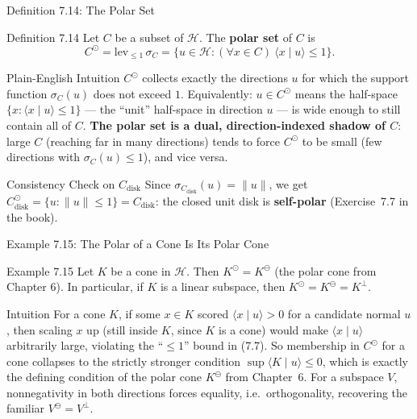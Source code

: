 \documentclass[aspectratio=169,10pt]{beamer}
\newcommand{\Hil}{\mathcal{H}}
\newcommand{\ip}[2]{\langle #1 \mid #2 \rangle}
\begin{document}
\begin{frame}{Definition 7.14: The Polar Set}

  \begin{block}{Definition 7.14}
    Let $C$ be a subset of $\Hil$. The \textbf{polar set} of $C$ is
    \[
      C^\odot = \mathrm{lev}_{\le 1}\, \sigma_C = \{u \in \Hil :
      (\forall x \in C)\ \ip{x}{u} \le 1\}. \tag{7.7}
    \]
  \end{block}

  \begin{block}{Plain-English Intuition}
    $C^\odot$ collects exactly the directions $u$ for which the support
    function $\sigma_C(u)$ does not exceed $1$. Equivalently: $u \in
    C^\odot$ means the half-space $\{x : \ip{x}{u}\le 1\}$ --- the ``unit''
    half-space in direction $u$ --- is wide enough to still contain all of
    $C$. \textbf{The polar set is a dual, direction-indexed shadow of $C$}:
    large $C$ (reaching far in many directions) tends to force $C^\odot$ to
    be small (few directions with $\sigma_C(u)\le 1$), and vice versa.
  \end{block}

  \begin{block}{Consistency Check on $C_{\mathrm{disk}}$}
    Since $\sigma_{C_{\mathrm{disk}}}(u) = \|u\|$, we get
    $C_{\mathrm{disk}}^\odot = \{u : \|u\| \le 1\} = C_{\mathrm{disk}}$: the
    closed unit disk is \textbf{self-polar} (Exercise~7.7 in the book).
  \end{block}

\end{frame}

\begin{frame}{Example 7.15: The Polar of a Cone Is Its Polar Cone}

  \begin{exampleblock}{Example 7.15}
    Let $K$ be a cone in $\Hil$. Then $K^\odot = K^\ominus$ (the polar cone
    from Chapter 6). In particular, if $K$ is a linear subspace, then
    $K^\odot = K^\ominus = K^\perp$.
  \end{exampleblock}

  \begin{block}{Intuition}
    For a cone $K$, if some $x \in K$ scored $\ip{x}{u} > 0$ for a candidate
    normal $u$, then scaling $x$ up (still inside $K$, since $K$ is a cone)
    would make $\ip{x}{u}$ arbitrarily large, violating the ``$\le 1$''
    bound in (7.7). So membership in $C^\odot$ for a cone collapses to the
    strictly stronger condition $\sup\ip{K}{u} \le 0$, which is exactly the
    defining condition of the polar cone $K^\ominus$ from Chapter~6. For a
    subspace $V$, nonnegativity in both directions forces equality, i.e.\
    orthogonality, recovering the familiar $V^\ominus = V^\perp$.
  \end{block}

\end{frame}
\end{document}
